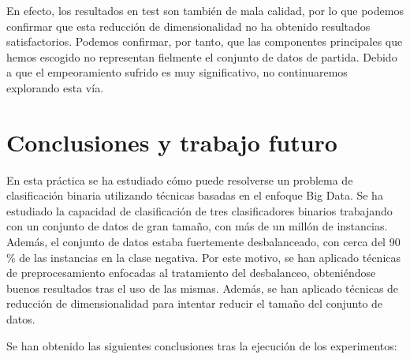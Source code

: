 \documentclass[
  a4paper,
,tablecaptionabove
]{scrartcl}
\begin{document}
En efecto, los resultados en test son también de mala calidad, por lo
que podemos confirmar que esta reducción de dimensionalidad no ha
obtenido resultados satisfactorios. Podemos confirmar, por tanto, que
las componentes principales que hemos escogido no representan fielmente
el conjunto de datos de partida. Debido a que el empeoramiento sufrido
es muy significativo, no continuaremos explorando esta vía.

\hypertarget{conclusiones-y-trabajo-futuro}{%
\section{Conclusiones y trabajo
futuro}\label{conclusiones-y-trabajo-futuro}}

En esta práctica se ha estudiado cómo puede resolverse un problema de
clasificación binaria utilizando técnicas basadas en el enfoque Big
Data. Se ha estudiado la capacidad de clasificación de tres
clasificadores binarios trabajando con un conjunto de datos de gran
tamaño, con más de un millón de instancias. Además, el conjunto de datos
estaba fuertemente desbalanceado, con cerca del 90 \% de las instancias
en la clase negativa. Por este motivo, se han aplicado técnicas de
preprocesamiento enfocadas al tratamiento del desbalanceo, obteniéndose
buenos resultados tras el uso de las mismas. Además, se han aplicado
técnicas de reducción de dimensionalidad para intentar reducir el tamaño
del conjunto de datos.

Se han obtenido las siguientes conclusiones tras la ejecución de los
experimentos:
\end{document}
